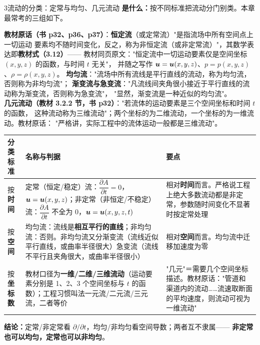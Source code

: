 \begin{kaodian}{3}{流动的分类：定常与均匀、几元流动}
\textbf{是什么：}按不同标准把流动分门别类。本章最常考的三组如下。

\textbf{教材原话（书 p32、p36、p37）}：\textbf{恒定流}（或定常流）"是指流场中所有空间点上一切运动
要素均不随时间变化，反之，称为非恒定流（或非定常流）"，其数学表达即\textbf{教材式（3.12）}——
教材同页原文："恒定流中一切运动要素仅是空间坐标 $(x,y,z)$ 的函数，与时间 $t$ 无关"，
并随之写作 $\bm{u}=\bm{u}(x,y,z)$、$p=p(x,y,z)$、$\rho=\rho(x,y,z)$。
\textbf{均匀流}："流场中所有流线是平行直线的流动，称为均匀流，否则称为非均匀流"；
\textbf{渐变流与急变流}："凡流线间夹角很小接近于平行直线的流动称为渐变流，否则称为急变流"，
"显然，渐变流是一种近似的均匀流"。\\
\textbf{几元流动（教材 3.2.2 节，书 p32）}："若流体的运动要素是三个空间坐标和时间 $t$ 的函数，
这种流动称为三维流动"；两个坐标的为二维流动，一个坐标的为一维流动。教材原话：
"严格讲，实际工程中的流体运动一般都是三维流动"。

\begin{center}
\begin{tabularx}{\textwidth}{@{}lXX@{}}
\toprule
分类标准 & 名称与判据 & 要点 \\
\midrule
按\textbf{时间} & 定常（恒定/稳定）流：$\dfrac{\partial A}{\partial t}=0$，$\bm{u}=\bm{u}(x,y,z)$；\newline 非定常（非恒定/不稳定）流：$\dfrac{\partial A}{\partial t}$ 不全为 0，$\bm{u}=\bm{u}(x,y,z,t)$ & 相对\textbf{时间}而言。严格说工程上绝大多数流动都是非定常，参数随时间变化不显著时按定常处理 \\
按\textbf{空间} & 均匀流：流线是\textbf{相互平行的直线}；非均匀流：否则。非均匀流又分\newline 渐变流（流线近似平行直线，或曲率半径很大）\newline 急变流（流线不平行且夹角很大，或曲率半径很小）& 相对\textbf{空间}而言。均匀流中迁移加速度为零 \\
按\textbf{坐标数} & 教材口径为\textbf{一维/二维/三维流动}（运动要素分别是 1、2、3 个空间坐标与 $t$ 的函数）；工程习惯叫法一元流/二元流/三元流，二者等价 & "几元"＝需要几个空间坐标描述。教材原话："管道和渠道内的流动……流速取断面的平均速度，则流动可视为一维流动" \\
\bottomrule
\end{tabularx}
\end{center}

\textbf{结论：}定常/非定常看 $\partial/\partial t$，均匀/非均匀看空间导数；两者互不隶属——
\textbf{非定常也可以均匀，定常也可以非均匀}。


\end{kaodian}
